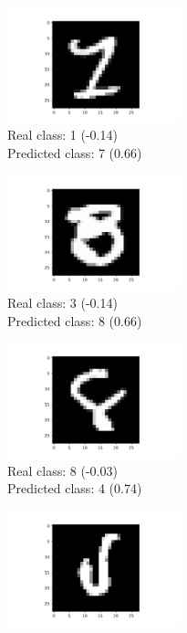 \documentclass[a4paper]{article}    %
\begin{document}
\begin{figure}[H]
\begin{subfigure}{0.32\textwidth}
        \includegraphics[width=5.0cm]{18}
        \caption{
            Real class: 1 (-0.14)\\
            Predicted class: 7 (0.66)}
        \label{fig:example_8}
    \end{subfigure}
    \hfill
    \begin{subfigure}{0.32\textwidth}
        \centering
        \includegraphics[width=5.0cm]{19}
        \caption{
            Real class: 3 (-0.14)\\
            Predicted class: 8 (0.66)}
        \label{fig:example_9}
    \end{subfigure}
    \hfill
    \begin{subfigure}{0.32\textwidth}
        \centering
        \includegraphics[width=5.0cm]{22}
        \caption{
            Real class: 8 (-0.03)\\
            Predicted class: 4 (0.74)}
        \label{fig:example_10}
    \end{subfigure}
    \hfill
    \begin{subfigure}{0.32\textwidth}
        \centering
        \includegraphics[width=5.0cm]{24}

\end{subfigure}
\end{figure}
\end{document}
